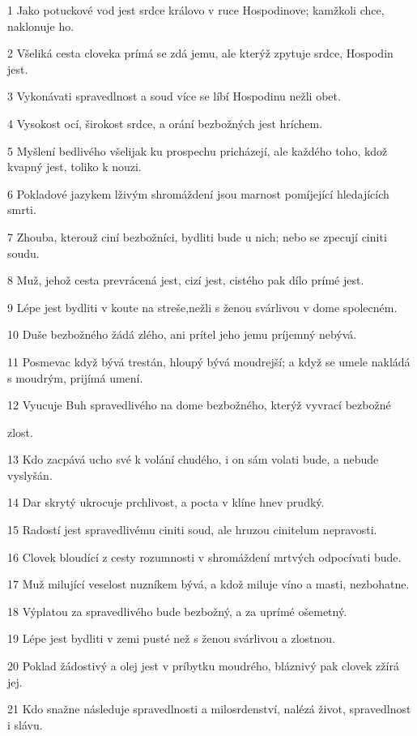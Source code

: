 \par 1 Jako potuckové vod jest srdce královo v ruce Hospodinove; kamžkoli chce, naklonuje ho.
\par 2 Všeliká cesta cloveka prímá se zdá jemu, ale kterýž zpytuje srdce, Hospodin jest.
\par 3 Vykonávati spravedlnost a soud více se líbí Hospodinu nežli obet.
\par 4 Vysokost ocí, širokost srdce, a orání bezbožných jest hríchem.
\par 5 Myšlení bedlivého všelijak ku prospechu pricházejí, ale každého toho, kdož kvapný jest, toliko k nouzi.
\par 6 Pokladové jazykem lživým shromáždení jsou marnost pomíjející hledajících smrti.
\par 7 Zhouba, kterouž ciní bezbožníci, bydliti bude u nich; nebo se zpecují ciniti soudu.
\par 8 Muž, jehož cesta prevrácená jest, cizí jest, cistého pak dílo prímé jest.
\par 9 Lépe jest bydliti v koute na streše,nežli s ženou svárlivou v dome spolecném.
\par 10 Duše bezbožného žádá zlého, ani prítel jeho jemu príjemný nebývá.
\par 11 Posmevac když bývá trestán, hloupý bývá moudrejší; a když se umele nakládá s moudrým, prijímá umení.
\par 12 Vyucuje Buh spravedlivého na dome bezbožného, kterýž vyvrací bezbožné \par zlost.
\par 13 Kdo zacpává ucho své k volání chudého, i on sám volati bude, a nebude vyslyšán.
\par 14 Dar skrytý ukrocuje prchlivost, a pocta v klíne hnev prudký.
\par 15 Radostí jest spravedlivému ciniti soud, ale hruzou cinitelum nepravosti.
\par 16 Clovek bloudící z cesty rozumnosti v shromáždení mrtvých odpocívati bude.
\par 17 Muž milující veselost nuzníkem bývá, a kdož miluje víno a masti, nezbohatne.
\par 18 Výplatou za spravedlivého bude bezbožný, a za uprímé ošemetný.
\par 19 Lépe jest bydliti v zemi pusté než s ženou svárlivou a zlostnou.
\par 20 Poklad žádostivý a olej jest v príbytku moudrého, bláznivý pak clovek zžírá jej.
\par 21 Kdo snažne následuje spravedlnosti a milosrdenství, nalézá život, spravedlnost i slávu.
